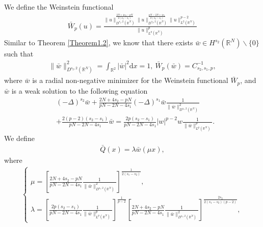 \documentclass[12pt,a4paper,reqno]{amsart}
\numberwithin{equation}{section}
\begin{document}
We define the Weinstein functional
\begin{equation*}
\begin{aligned}
\bar{W}_{p}(u)=
\frac{
\|u\|_{D^{s_{1},2}(\mathbb{R}^{N})}^{\frac{2N+4s_{2}-pN}{2(s_{2}-s_{1})}}
\|u\|_{D^{s_{2},2}(\mathbb{R}^{N})}^{\frac{pN-2N+4s_{1}}{2(s_{2}-s_{1})}}
\|u\|_{L^{2}(\mathbb{R}^{N})}^{p-2}
}{\|u\|_{L^{p}(\mathbb{R}^{N})}^{p}}
\end{aligned}
\end{equation*}
Similar to Theorem \ref{Theorem1.2},
we know that there exists $\bar{w}\in H^{s_{2}}(\mathbb{R}^{N})\backslash\{0\}$ such that
\begin{equation*}
\begin{aligned}
\|\bar{w}\|_{D^{s_{2},2}(\mathbb{R}^{N})}^{2}= \int_{\mathbb{R}^{2}}|\bar{w}|^{2}\mathrm{d}x=1,~
\bar{W}_{p}(\bar{w})=C_{s_{2},s_{1},p}^{-1},
\end{aligned}
\end{equation*}
where $\bar{w}$ is a radial non-negative minimizer for the Weinstein functional $\bar{W}_{p}$,
and $\bar{w}$ is a weak solution to the following equation
\begin{equation*}
\begin{aligned}
&(-\Delta)^{s_{2}}\bar{w}
+\frac{2N+4s_{2}-pN}{pN-2N-4s_{1}}
(-\Delta)^{s_{1}}\bar{w}
\frac{1}{\|\bar{w}\|_{D^{s_{1},2}(\mathbb{R}^{N})}^{2}}\\
&+\frac{2(p-2)(s_{2}-s_{1})}{pN-2N-4s_{1}}\bar{w}
=
\frac{2p(s_{2}-s_{1})}{pN-2N-4s_{1}}
|w|^{p-2}w
\frac{1}
{\|\bar{w}\|_{L^{p}(\mathbb{R}^{N})}^{p}}.
\end{aligned}
\end{equation*}
We define
\begin{equation}\label{8.4}
\begin{aligned}
\bar{Q}(x)=\lambda \bar{w}(\mu x),
\end{aligned}
\end{equation}
where
\begin{equation*}
\begin{aligned}
\begin{cases}
\mu=
\left[
\frac{2N+4s_{2}-pN}{pN-2N-4s_{1}}
\frac{1}{\|\bar{w}\|_{D^{s_{1},2}(\mathbb{R}^{N})}^{2}}
\right]^{\frac{1}{2(s_{1}-s_{2})}},\\
\lambda
=
\left[
\frac{2p(s_{2}-s_{1})}{pN-2N-4s_{1}}
\frac{1}{\|\bar{w}\|_{L^{p}(\mathbb{R}^{N})}^{p}}
\right]^{\frac{1}{p-2}}
\left[
\frac{2N+4s_{2}-pN}{pN-2N-4s_{1}}
\frac{1}{\|\bar{w}\|_{D^{s_{1},2}(\mathbb{R}^{N})}^{2}}
\right]^{\frac{2s_{2}}{2(s_{1}-s_{2})(p-2)}},
\end{cases}
\end{aligned}
\end{equation*}
\end{document}
